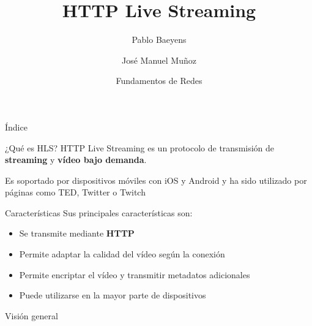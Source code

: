 \documentclass[10pt,compress,usetitleprogressbar,mathserif]{beamer}
\title{HTTP Live Streaming}
\author{Pablo Baeyens \and José Manuel Muñoz}
\date{Fundamentos de Redes}
\begin{document}
\maketitle

\begin{frame}{Índice}
  \tableofcontents
\end{frame}

\begin{frame}{¿Qué es HLS?}
  HTTP Live Streaming es un protocolo de transmisión de \textbf{streaming} y \textbf{vídeo bajo demanda}.

  Es soportado por dispositivos móviles con iOS y Android y ha sido utilizado por páginas como TED, Twitter o Twitch
\end{frame}

\begin{frame}{Características}
  Sus principales características son:
  \begin{itemize}
    \item Se transmite mediante \textbf{HTTP} %
    \item Permite adaptar la calidad del vídeo según la conexión
    \item Permite encriptar el vídeo y transmitir metadatos adicionales
    \item Puede utilizarse en la mayor parte de dispositivos
  \end{itemize}
\end{frame}

\begin{frame}{Visión general}
\end{frame}
\end{document}
